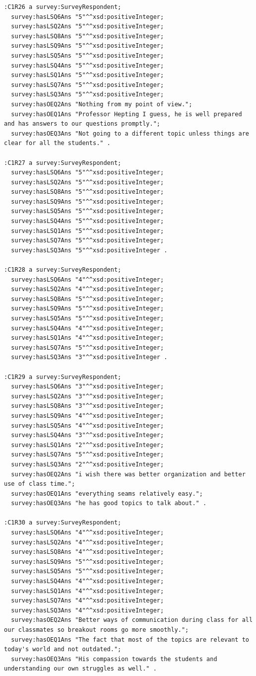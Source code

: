 \begin{lstlisting}
:C1R26 a survey:SurveyRespondent;
  survey:hasLSQ6Ans "5"^^xsd:positiveInteger;
  survey:hasLSQ2Ans "5"^^xsd:positiveInteger;
  survey:hasLSQ8Ans "5"^^xsd:positiveInteger;
  survey:hasLSQ9Ans "5"^^xsd:positiveInteger;
  survey:hasLSQ5Ans "5"^^xsd:positiveInteger;
  survey:hasLSQ4Ans "5"^^xsd:positiveInteger;
  survey:hasLSQ1Ans "5"^^xsd:positiveInteger;
  survey:hasLSQ7Ans "5"^^xsd:positiveInteger;
  survey:hasLSQ3Ans "5"^^xsd:positiveInteger;
  survey:hasOEQ2Ans "Nothing from my point of view.";
  survey:hasOEQ1Ans "Professor Hepting I guess, he is well prepared and has answers to our questions promptly.";
  survey:hasOEQ3Ans "Not going to a different topic unless things are clear for all the students." .

:C1R27 a survey:SurveyRespondent;
  survey:hasLSQ6Ans "5"^^xsd:positiveInteger;
  survey:hasLSQ2Ans "5"^^xsd:positiveInteger;
  survey:hasLSQ8Ans "5"^^xsd:positiveInteger;
  survey:hasLSQ9Ans "5"^^xsd:positiveInteger;
  survey:hasLSQ5Ans "5"^^xsd:positiveInteger;
  survey:hasLSQ4Ans "5"^^xsd:positiveInteger;
  survey:hasLSQ1Ans "5"^^xsd:positiveInteger;
  survey:hasLSQ7Ans "5"^^xsd:positiveInteger;
  survey:hasLSQ3Ans "5"^^xsd:positiveInteger .

:C1R28 a survey:SurveyRespondent;
  survey:hasLSQ6Ans "4"^^xsd:positiveInteger;
  survey:hasLSQ2Ans "4"^^xsd:positiveInteger;
  survey:hasLSQ8Ans "5"^^xsd:positiveInteger;
  survey:hasLSQ9Ans "5"^^xsd:positiveInteger;
  survey:hasLSQ5Ans "5"^^xsd:positiveInteger;
  survey:hasLSQ4Ans "4"^^xsd:positiveInteger;
  survey:hasLSQ1Ans "4"^^xsd:positiveInteger;
  survey:hasLSQ7Ans "5"^^xsd:positiveInteger;
  survey:hasLSQ3Ans "3"^^xsd:positiveInteger .

:C1R29 a survey:SurveyRespondent;
  survey:hasLSQ6Ans "3"^^xsd:positiveInteger;
  survey:hasLSQ2Ans "3"^^xsd:positiveInteger;
  survey:hasLSQ8Ans "3"^^xsd:positiveInteger;
  survey:hasLSQ9Ans "4"^^xsd:positiveInteger;
  survey:hasLSQ5Ans "4"^^xsd:positiveInteger;
  survey:hasLSQ4Ans "3"^^xsd:positiveInteger;
  survey:hasLSQ1Ans "2"^^xsd:positiveInteger;
  survey:hasLSQ7Ans "5"^^xsd:positiveInteger;
  survey:hasLSQ3Ans "2"^^xsd:positiveInteger;
  survey:hasOEQ2Ans "i wish there was better organization and better use of class time.";
  survey:hasOEQ1Ans "everything seams relatively easy.";
  survey:hasOEQ3Ans "he has good topics to talk about." .

:C1R30 a survey:SurveyRespondent;
  survey:hasLSQ6Ans "4"^^xsd:positiveInteger;
  survey:hasLSQ2Ans "4"^^xsd:positiveInteger;
  survey:hasLSQ8Ans "4"^^xsd:positiveInteger;
  survey:hasLSQ9Ans "5"^^xsd:positiveInteger;
  survey:hasLSQ5Ans "5"^^xsd:positiveInteger;
  survey:hasLSQ4Ans "4"^^xsd:positiveInteger;
  survey:hasLSQ1Ans "4"^^xsd:positiveInteger;
  survey:hasLSQ7Ans "4"^^xsd:positiveInteger;
  survey:hasLSQ3Ans "4"^^xsd:positiveInteger;
  survey:hasOEQ2Ans "Better ways of communication during class for all our classmates so breakout rooms go more smoothly.";
  survey:hasOEQ1Ans "The fact that most of the topics are relevant to today's world and not outdated.";
  survey:hasOEQ3Ans "His compassion towards the students and understanding our own struggles as well." .


\end{lstlisting}

